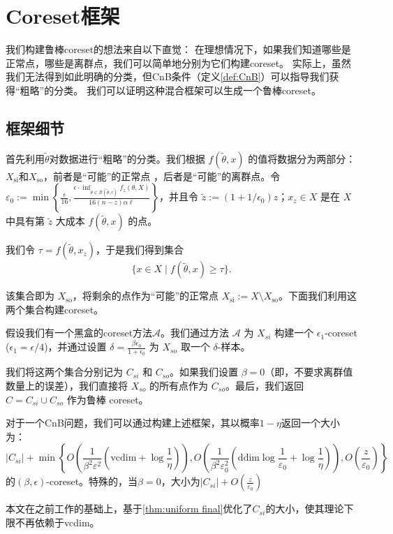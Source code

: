 \chapter{Coreset框架}

我们构建鲁棒coreset的想法来自以下直觉：
在理想情况下，如果我们知道哪些是正常点，哪些是离群点，我们可以简单地分别为它们构建coreset。
实际上，虽然我们无法得到如此明确的分类，但CnB条件（定义\ref{def:CnB}）可以指导我们获得“粗略”的分类。
我们可以证明这种混合框架可以生成一个鲁棒coreset。

\section{框架细节}

首先利用$\tilde{\theta}$对数据进行“粗略”的分类。我们根据 $f(\tilde{\theta}, x)$ 的值将数据分为两部分：$X_{\text{si}}$和$X_{\text{so}}$，前者是“可能”的正常点
，后者是“可能”的离群点。令 $\varepsilon_0 := \min \left\{ \frac{\epsilon}{16}, \frac{\epsilon \cdot \inf_{\theta \in \mathcal{B}(\tilde{\theta}, \epsilon)} f_z(\theta, X)}{16(n - z) \alpha \ell} \right\}$，并且令 $\tilde{z} := (1 + 1/\epsilon_0) z$；$x_z \in X$ 是在 $X$ 中具有第 $\tilde{z}$ 大成本 $f(\tilde{\theta}, x)$ 的点。

我们令 $\tau = f(\tilde{\theta}, x_z)$，于是我们得到集合
\begin{equation}
\{ x \in X \mid f(\tilde{\theta}, x) \geq \tau \}.
\end{equation}

该集合即为 $X_{\text{so}}$，将剩余的点作为“可能”的正常点 $X_{\text{si}} := X \setminus X_{\text{so}}$。下面我们利用这两个集合构建coreset。

假设我们有一个黑盒的coreset方法$\mathcal{A}$。我们通过方法 $\mathcal{A}$ 为 $X_{si}$ 构建一个 $\epsilon_1$-coreset ($\epsilon_1 = \epsilon / 4$)，并通过设置 $\delta = \frac{\beta \epsilon_0}{1 + \epsilon_0}$ 为 $X_{so}$ 取一个 $\delta$-样本。

我们将这两个集合分别记为 $C_{si}$ 和 $C_{so}$。如果我们设置 $\beta = 0$（即，不要求离群值数量上的误差），我们直接将 $X_{so}$ 的所有点作为 $C_{so}$。最后，我们返回 $C = C_{si} \cup C_{so}$ 作为鲁棒 coreset。

\begin{theorem}
    对于一个CnB问题，我们可以通过构建上述框架，其以概率$1-\eta$返回一个大小为：
    \begin{equation*}
        |C_{si}|+\min\left\{O\left(\frac{1}{\beta^2\varepsilon^2}(\text{vcdim}+\log \frac 1 \eta)\right),O\left(\frac{1}{\beta^2\varepsilon_0^2}(\text{ddim}\log\frac{1}{\varepsilon_0}+\log \frac{1}{\eta})\right),O\left(\frac z {\varepsilon_0}\right)\right\}
    \end{equation*}
的$(\beta,\epsilon)$-coreset。特殊的，当$\beta = 0$，大小为$|C_{si}|+O\left(\frac{z}{\varepsilon_0}\right)$
\end{theorem}
本文在之前工作的基础上，基于\ref{thm:uniform final}优化了$C_{si}$的大小，使其理论下限不再依赖于vcdim。

